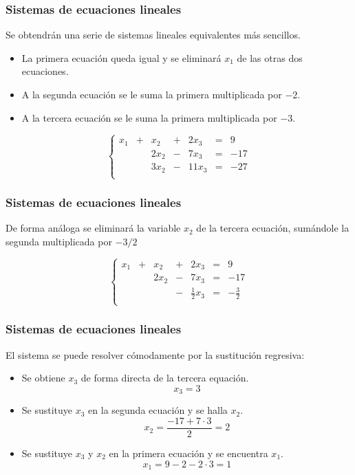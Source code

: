 \documentclass[12pt]{article}
\begin{document}
    
               \begin{frame}
    \frametitle{Sistemas de ecuaciones lineales}
Se obtendr\'an una serie de sistemas lineales equivalentes m\'as sencillos.
\begin{itemize}
\item La primera ecuaci\'on queda igual y se eliminar\'a $x_1$ de las otras dos ecuaciones.
\item A la segunda ecuaci\'on se le suma la primera multiplicada por $-2$.
\item A la tercera ecuaci\'on se le suma la primera multiplicada por $-3$.
\end{itemize}

\[\left\{\begin{array}{ccccccc}
x_1 & + & x_2 & + & 2x_3 & = & 9\\
 &  & 2x_2 & - & 7x_3 & = & -17\\
 &  & 3x_2 & - &  11x_3 & = & -27\\
\end{array}\right.\]

  \end{frame} 

               \begin{frame}
    \frametitle{Sistemas de ecuaciones lineales}
    De forma an\'aloga se eliminar\'a la variable $x_2$ de la tercera ecuaci\'on, sum\'andole la segunda multiplicada por $-3/2$
    
\[\left\{\begin{array}{ccccccc}
x_1 & + & x_2 & + & 2x_3 & = & 9\\
 &  & 2x_2 & - & 7x_3 & = & -17\\
 &  & & - &  \frac{1}{2}x_3 & = & -\frac{3}{2}\\
\end{array}\right.\]

  \end{frame} 
  
                 \begin{frame}
    \frametitle{Sistemas de ecuaciones lineales}
El sistema se puede resolver c\'omodamente por la sustituci\'on regresiva:
    \begin{itemize}
\item Se obtiene $x_3$ de forma directa de la tercera equaci\'on.
\[x_3 = 3\]
\item Se sustituye $x_3$ en la segunda ecuaci\'on y se halla $x_2$.
\[x_2 = \frac{-17+7\cdot 3}{2} = 2\]
\item Se sustituye $x_3$ y $x_2$ en la primera ecuaci\'on y se encuentra $x_1$.
\[x_1 = 9-2-2\cdot3 = 1\]
\end{itemize}
  \end{frame} 
\end{document}
